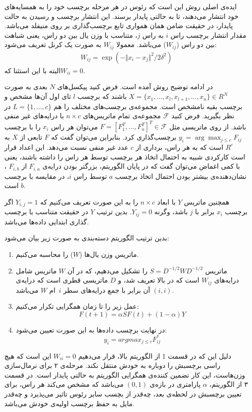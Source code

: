 \documentclass[11pt]{article}
\begin{document}
ایده‌ی اصلی روش \LGC{} این است که رئوس در هر مرحله برچسب خود را به همسایه‌های خود انتشار می‌دهند، تا به حالتی پایدار برسند. این انتشار برچسب و رسیدن به حالت پایدار، در حقیقت ضامن همان همواری تابع برچسب‌گذاری بر روی منیفلد می‌باشد. مقدار انتشار برچسب راس $i$ به راس $j$، متناسب با وزن یال بین دو راس، یعنی شباهت بین دو راس ($W_{ij}$) می‌باشد. معمولا $W_{ij}$ به صورت یک کرنل  تعریف می‌شود:
\begin{eqnarray}
W_{ij} = \exp(-\Vert x_i - x_j \Vert ^ 2 / 2 \delta^2)
\end{eqnarray}
البته با این استثنا که$W_{ii} = 0$.

در ادامه توضیح روش \LGC{} آمده است. فرض کنید پیکسل‌های $N$ بعدی به صورت 
$X = \{x_1, \ldots, x_l, x_{l+1}, \ldots, x_n\} \in R^N$
باشند که برچسب $l$ تای اول آن‌ها مشخص و برچسب بقیه نامشخص است. مجموعه‌ی برچسب‌های مختلف را هم $L = \{1, \ldots, c\}$ در نظر بگیرید. فرض کنید $\mathcal{F}$ مجموعه‌ی تمام ماتریس‌های $n \times c$ با درایه‌های غیر منفی باشد. از روی ماتریسی مثل $F = [F_1^T, \ldots, F_n^T]^T \in \mathcal{F}$ می‌توان هر راس $x_i$ را با برچسب $y_i = \displaystyle \arg\max_{j \leq c} F_{ij}$ برچسب‌گذاری کرد. بنابراین می‌توان گفت که $F$ تابعی از $X$ به $R^c$ است که به هر راس، برداری از $c$ عدد غیر منفی نسبت می‌دهد. این اعداد قرار است کارکردی شبیه به احتمال اتخاذ هر برچسب توسط هر راس را داشته باشند، یعنی با کمی اغماض می‌توان گفت که در پایان الگوریتم، بزرگتر بودن درایه‌ی $F_{i,a}$ از $F_{i,b}$ ، نشان‌دهنده‌ی بیشتر بودن احتمال اتخاذ برچسب $a$ توسط راس $i$، در مقایسه با برچسب $b$ است.

همچنین ماتریس $Y$ با ابعاد $n \times c$ را به این صورت تعریف می‌کنیم که $Y_{i,j} = 1$ اگر برچسب $x_i$ برابر با $j$ باشد، وگرنه $Y_{ij} = 0$. بدین ترتیب $Y$ در حقیقت متناسب با برچسب گذاری ابتدایی داده‌ها می‌باشد.

بدین ترتیب الگوریتم دسته‌بندی به صورت زیر بیان می‌شود:
\begin{enumerate}
\item
ماتریس وزن یال‌ها ($W$) را محاسبه می‌کنیم.
\item
ماتریس 
$S = D^{-1/2}WD^{-1/2}$
 را تشکیل می‌دهیم، که در آن $W$  ماتریس شامل درایه‌های $W_{ij}$ است که در بالا تعریف شد، و $D$ ماتریسی قطری است که درایه‌ی $(i,i)$ آن برابر با جمع درایه‌های سطر $i$~ام $W$ می‌باشد.
\item
عمل زیر را تا زمان همگرایی تکرار می‌کنیم:
$$F(t+1) = \alpha SF(t) + (1-\alpha)Y$$
\item
در نهایت برچسب داده‌ها به این صورت تعیین می‌شود:
$$y_i = argmax_{j \leq c} F_{ij}^*$$
\end{enumerate}
دلیل این که در قسمت  1 از الگوریتم بالا، قرار می‌دهیم
$W_{ii} = 0$
این است که هیچ راسی برچسبش را دوباره به خودش منتقل نکند.
مرحله‌ی ۲ برای نرمال‌سازی وزن‌هاست، این کار تضمین کننده‌ی همگرایی الگوریتم به حالتی پایدار است.
در قسمت ۳ از الگوریتم، $\alpha$ پارامتری در بازه‌ی $(0,1)$ می‌باشد که مشخص می‌کند هر راس، برای تعیین برچسبش در لحظه‌ی بعد، چه‌قدر از بچسب سایر رئوس تاثیر می‌پذیرد و چه‌قدر مایل به حفظ برچسب اولیه‌ی خودش می‌باشد.
\end{document}
